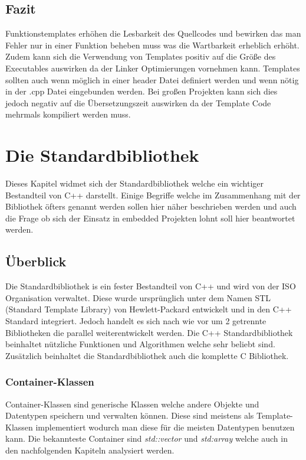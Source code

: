 \documentclass[MES,Master,ngerman]{twbook}%
\begin{document}
\subsection{Fazit}
Funktionstemplates erhöhen die Lesbarkeit des Quellcodes und bewirken das man Fehler nur in einer Funktion beheben muss was die Wartbarkeit erheblich erhöht. Zudem kann sich die Verwendung von Templates positiv auf die Größe des Executables auswirken da der Linker Optimierungen vornehmen kann. Templates sollten auch wenn möglich in einer header Datei definiert werden und wenn nötig in der .cpp Datei eingebunden werden. Bei großen Projekten kann sich dies jedoch negativ auf die Übersetzungszeit auswirken da der Template Code mehrmals kompiliert werden muss.
\newpage

\section{Die Standardbibliothek}
Dieses Kapitel widmet sich der Standardbibliothek welche ein wichtiger Bestandteil von C++ darstellt. Einige Begriffe welche im Zusammenhang mit der Bibliothek öfters genannt werden sollen hier näher beschrieben werden und auch die Frage ob sich der Einsatz in embedded Projekten lohnt soll hier beantwortet werden.
\subsection{Überblick}
Die Standardbibliothek is ein fester Bestandteil von C++ und wird von der ISO Organisation verwaltet. Diese wurde ursprünglich unter dem Namen STL (Standard Template Library) von Hewlett-Packard entwickelt und in den C++ Standard integriert. Jedoch handelt es sich nach wie vor um 2 getrennte Bibliotheken die parallel weiterentwickelt werden. Die C++ Standardbibliothek beinhaltet nützliche Funktionen und Algorithmen welche sehr beliebt sind. Zusätzlich beinhaltet die Standardbibliothek auch die komplette C Bibliothek. 

\subsubsection{Container-Klassen}
Container-Klassen sind generische Klassen welche andere Objekte und Datentypen speichern und verwalten können. Diese sind meistens als Template-Klassen implementiert wodurch man diese für die meisten Datentypen benutzen kann. Die bekannteste Container sind \textit{std::vector} und \textit{std:array} welche auch in den nachfolgenden Kapiteln analysiert werden.
\end{document}
